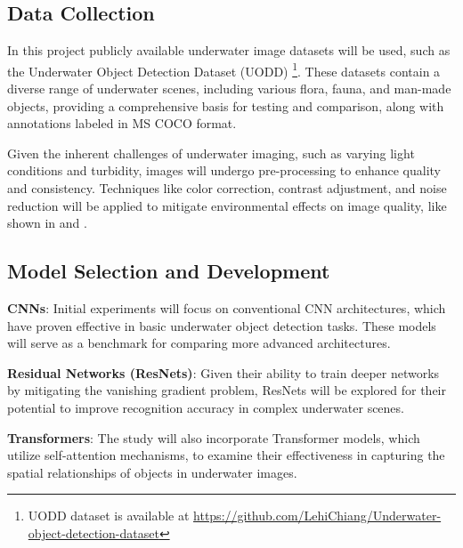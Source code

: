 \subsection{Data Collection}

In this project publicly available underwater image datasets will be used,
such as the Underwater Object Detection Dataset (UODD) 
\parencite{jiangUnderwaterSpeciesDetection2021}
\footnote{UODD dataset is available at
\url{https://github.com/LehiChiang/Underwater-object-detection-dataset}}.
These datasets contain a diverse range of underwater scenes, including various
flora, fauna, and man-made objects, providing a comprehensive basis for testing
and comparison, along with annotations labeled in MS COCO format.

Given the inherent challenges of underwater imaging,
such as varying light conditions and turbidity, images will undergo
pre-processing to enhance quality and consistency.
Techniques like color correction, contrast adjustment,
and noise reduction will be applied to mitigate environmental effects on
image quality, like shown in \parencite{tengUnderwaterTargetRecognition2020}
and \parencite{pengUshapeTransformerUnderwater2023}.

\subsection{Model Selection and Development}

\begin{APAitemize}
    \item \textbf{CNNs}: Initial experiments will focus on conventional
     CNN architectures, which have proven effective in basic underwater object
     detection tasks.
     These models will serve as a benchmark for comparing more advanced
     architectures. %

    \item \textbf{Residual Networks (ResNets)}: Given their ability to train
     deeper networks by mitigating the vanishing gradient problem,
     ResNets will be explored for their potential to improve recognition
     accuracy in complex underwater scenes. %

     \item \textbf{Transformers}: The study will also incorporate Transformer
     models, which utilize self-attention mechanisms, to examine their
     effectiveness in capturing the spatial relationships of objects in
     underwater images. %
\end{APAitemize}

